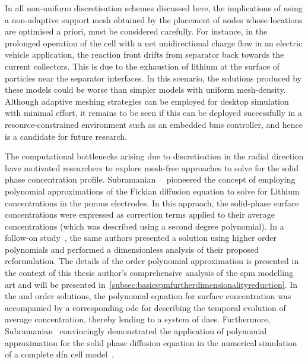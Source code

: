 In all  non-uniform discretisation schemes  discussed here, the  implications of
using  a non-adaptive  support mesh  obtained by  the placement  of nodes  whose
locations are optimised a priori, must be considered carefully. For instance, in
the prolonged operation of the cell  with a net unidirectional charge flow \eg{}
in an  electric vehicle  application, the reaction  front drifts  from separator
back towards the current collectors. This is due to the exhaustion of lithium at
the surface  of particles near the  separator interfaces. In this  scenario, the
solutions  produced by  these models  could be  worse than  simpler models  with
uniform mesh-density. Although  adaptive meshing strategies can  be employed for
desktop simulation  with minimal effort,  it remains to be  seen if this  can be
deployed successfully in a resource-constrained  environment such as an embedded
\gls{bms} controller, and hence is  a candidate for future research.


The   computational   bottlenecks  arising   due   to   discretisation  in   the
radial   direction    have   motivated   researchers   to    explore   mesh-free
approaches   to    solve   for   the   solid    phase   concentration   profile.
Subramanian~\etal~\cite{Subramanian2004}  pioneered  the  concept  of  employing
polynomial approximations of the Fickian diffusion equation to solve for Lithium
concentrations  in the  porous  electrodes. In  this  approach, the  solid-phase
surface  concentrations were  expressed  as correction  terms  applied to  their
average concentrations (which  was described using a  second degree polynomial).
In  a   follow-on  study~\cite{Subramanian2005},  the  same   authors  presented
a  solution  using  higher  order  polynomials  and  performed  a  dimensionless
analysis of  their proposed reformulation.  The details of  the 
order  polynomial approximation  is  presented  in the  context  of this  thesis
author's  comprehensive  analysis  of  the  \gls{spm}  modelling  art  and  will
be  presented  in~\cref{subsec:basicspmfurtherdimensionalityreduction}.  In  the
 and   order solutions, the  polynomial equation
for  surface concentration  was  accompanied by  a  corresponding \gls{ode}  for
describing  the temporal  evolution  of average  concentration, thereby  leading
to  a  system  of  \glspl{dae}.  Furthermore,  Subramanian~\etal{}  convincingly
demonstrated the  application of  polynomial approximation  for the  solid phase
diffusion  equation in  the numerical  simulation of  a complete  \gls{dfn} cell
model~\cite{Subramanian2007}.


